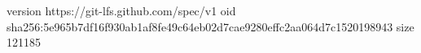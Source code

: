 version https://git-lfs.github.com/spec/v1
oid sha256:5e965b7df16f930ab1af8fe49c64eb02d7cae9280effc2aa064d7c1520198943
size 121185
